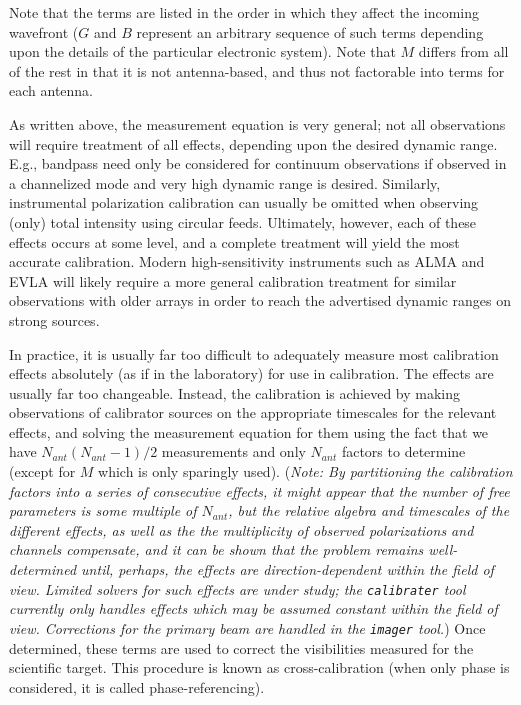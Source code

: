 Note that the terms are listed in the order in which they affect the
incoming wavefront ($G$ and $B$ represent an arbitrary sequence of
such terms depending upon the details of the particular electronic
system). Note that $M$ differs from all of the rest in that it is not
antenna-based, and thus not factorable into terms for each antenna. 

As written above, the measurement equation is very general; not all
observations will require treatment of all effects, depending upon the
desired dynamic range. E.g., bandpass need only be considered for
continuum observations if observed in a channelized mode and very high
dynamic range is desired. Similarly, instrumental polarization
calibration can usually be omitted when observing (only) total
intensity using circular feeds. Ultimately, however, each of these
effects occurs at some level, and a complete treatment will yield the
most accurate calibration. Modern high-sensitivity instruments such as
ALMA and EVLA will likely require a more general calibration treatment
for similar observations with older arrays in order to reach the
advertised dynamic ranges on strong sources. 

In practice, it is usually far too difficult to adequately measure
most calibration effects absolutely (as if in the laboratory) for use
in calibration. The effects are usually far too changeable. Instead,
the calibration is achieved by making observations of calibrator
sources on the appropriate timescales for the relevant effects, and
solving the measurement equation for them using the fact that we have
$N_{ant}(N_{ant}-1)/2$ measurements and only $N_{ant}$ factors to
determine (except for $M$ which is only sparingly used). ({\it Note: By
partitioning the calibration factors into a series of consecutive
effects, it might appear that the number of free parameters is some
multiple of $N_{ant}$, but the relative algebra and timescales of the
different effects, as well as the the multiplicity of observed
polarizations and channels compensate, and it can be shown that the
problem remains well-determined until, perhaps, the effects are
direction-dependent within the field of view. Limited solvers for such
effects are under study; the {\tt calibrater} tool currently only handles
effects which may be assumed constant within the field of
view. Corrections for the primary beam are handled in the {\tt imager}
tool.}) Once determined, these terms are used to correct the
visibilities measured for the scientific target. This procedure is
known as cross-calibration (when only phase is considered, it is
called phase-referencing). 

